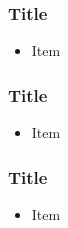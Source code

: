\documentclass{beamer}\usepackage[]{graphicx}\usepackage[]{color}
\begin{document}
\begin{frame}
\frametitle{Title}
    \begin{itemize}
        \item Item
    \end{itemize}
\end{frame}

\begin{frame}
\frametitle{Title}
    \begin{itemize}
        \item Item
    \end{itemize}
\end{frame}

\begin{frame}
\frametitle{Title}
    \begin{itemize}
        \item Item
    \end{itemize}
\end{frame}
\end{document}
